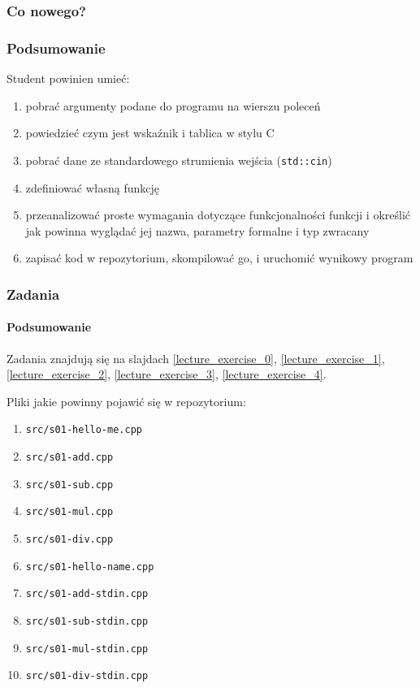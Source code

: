 \documentclass[aspectratio=169]{beamer}
\begin{document}
\begin{frame}
    \frametitle{Co nowego?}
    \frametitle{Podsumowanie}

    Student powinien umieć:

    \begin{enumerate}
        \item pobrać argumenty podane do programu na wierszu poleceń
        \item powiedzieć czym jest wskaźnik i tablica w stylu C
        \item pobrać dane ze standardowego strumienia wejścia ({\tt std::cin})
        \item zdefiniować własną funkcję
        \item przeanalizować proste wymagania dotyczące funkcjonalności funkcji
            i określić jak powinna wyglądać jej nazwa, parametry formalne i typ
            zwracany
        \item zapisać kod w repozytorium, skompilować go, i uruchomić wynikowy
            program
    \end{enumerate}
\end{frame}

\begin{frame}
    \frametitle{Zadania}
    \framesubtitle{Podsumowanie}

    Zadania znajdują się na slajdach
    \ref{lecture_exercise_0},
    \ref{lecture_exercise_1},
    \ref{lecture_exercise_2},
    \ref{lecture_exercise_3},
    \ref{lecture_exercise_4}.

    Pliki jakie powinny pojawić się w repozytorium:
    \begin{enumerate}
        \item {\tt src/s01-hello-me.cpp}
        \item {\tt src/s01-add.cpp}
        \item {\tt src/s01-sub.cpp}
        \item {\tt src/s01-mul.cpp}
        \item {\tt src/s01-div.cpp}
        \item {\tt src/s01-hello-name.cpp}
        \item {\tt src/s01-add-stdin.cpp}
        \item {\tt src/s01-sub-stdin.cpp}
        \item {\tt src/s01-mul-stdin.cpp}
        \item {\tt src/s01-div-stdin.cpp}
    \end{enumerate}
\end{frame}
\end{document}
